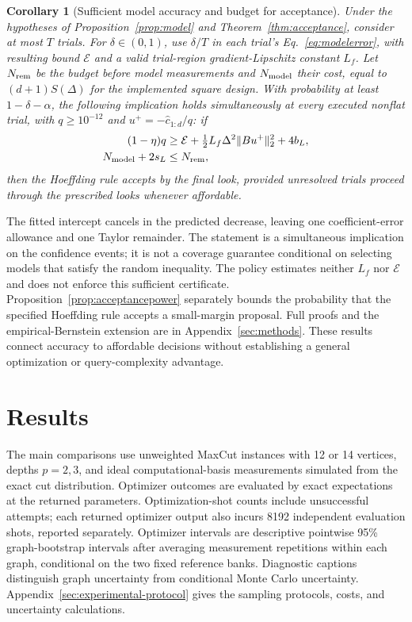 \documentclass[11pt]{article}
\newcommand{\norm}[1]{\lVert #1\rVert}
\newtheorem{corollary}[theorem]{Corollary}
\begin{document}
\begin{corollary}[Sufficient model accuracy and budget for acceptance]
\label{cor:modelacceptance}
Under the hypotheses of Proposition~\ref{prop:model} and
Theorem~\ref{thm:acceptance}, consider
at most $T$ trials. For $\delta\in(0,1)$, use $\delta/T$ in each trial's
Eq.~\eqref{eq:modelerror}, with resulting bound $\mathcal E$ and a valid
trial-region gradient-Lipschitz constant $L_f$. Let $N_{\rm rem}$ be the
budget before model measurements and $N_{\rm model}$ their cost, equal to
$(d+1)S(\Delta)$ for the implemented square design. With probability at
least $1-\delta-\alpha$, the following implication holds simultaneously
at every executed nonflat trial, with $q\ge10^{-12}$ and
$u^+=-\widehat c_{1:d}/q$: if
\begin{equation}
 \begin{aligned}
 (1-\eta)q&\ge\mathcal E+\tfrac12L_f\Delta^2\norm{Bu^+}_2^2+4b_L,\\
 N_{\rm model}+2s_L&\le N_{\rm rem},
 \end{aligned}
 \label{eq:modelacceptance}
\end{equation}
then the Hoeffding rule accepts by the final look, provided unresolved
trials proceed through the prescribed looks whenever affordable.
\end{corollary}

The fitted intercept cancels in the predicted decrease, leaving one
coefficient-error allowance and one Taylor remainder. The statement is a
simultaneous implication on the confidence events; it is not a coverage
guarantee conditional on selecting models that satisfy the random
inequality. The policy estimates neither $L_f$ nor $\mathcal E$ and does
not enforce this sufficient certificate. Proposition~\ref{prop:acceptancepower}
separately bounds the probability that the specified Hoeffding rule accepts
a small-margin proposal. Full proofs and the empirical-Bernstein extension
are in Appendix~\ref{sec:methods}. These results connect accuracy to
affordable decisions without establishing a general optimization or
query-complexity advantage.


\section{Results}
The main comparisons use unweighted MaxCut instances with 12 or 14 vertices,
depths $p=2,3$, and ideal computational-basis measurements simulated from
the exact cut distribution. Optimizer outcomes are evaluated by exact
expectations at the returned parameters. Optimization-shot counts include
unsuccessful attempts; each returned optimizer output also incurs 8192 independent
evaluation shots, reported separately. Optimizer intervals are descriptive
pointwise 95\% graph-bootstrap intervals after averaging measurement
repetitions within each graph, conditional on the two fixed reference banks.
Diagnostic captions distinguish graph uncertainty from conditional Monte
Carlo uncertainty. Appendix~\ref{sec:experimental-protocol} gives the
sampling protocols, costs, and uncertainty calculations.
\end{document}
